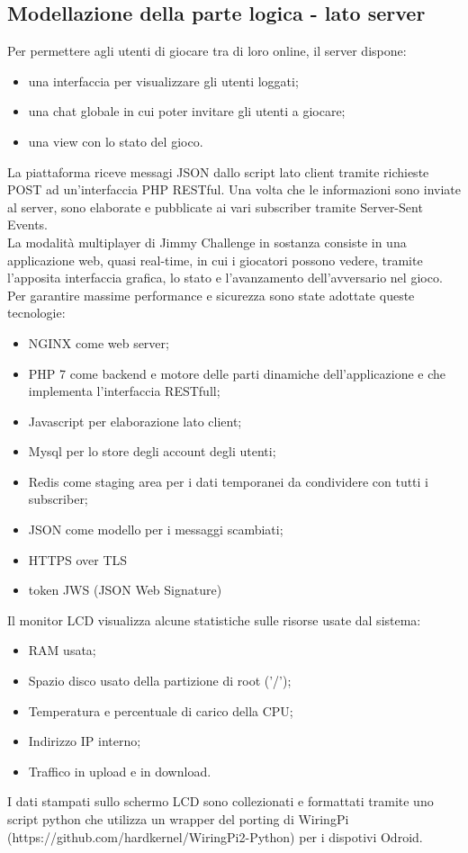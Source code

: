 \subsection{Modellazione della parte logica - lato server}
Per permettere agli utenti di giocare tra di loro online, il server dispone:
\begin{itemize}
	\item una interfaccia per visualizzare gli utenti loggati;
	\item una chat globale in cui poter invitare gli utenti a giocare;
	\item una view con lo stato del gioco.
\end{itemize}
La piattaforma riceve messagi JSON dallo script lato client tramite richieste POST ad un'interfaccia PHP RESTful. Una volta che le informazioni sono inviate al server, sono elaborate e pubblicate ai vari subscriber tramite Server-Sent Events.\\
La modalità multiplayer di Jimmy Challenge in sostanza consiste in una applicazione web, quasi real-time, in cui i giocatori possono vedere, tramite l'apposita interfaccia grafica, lo stato e l'avanzamento dell'avversario nel gioco.\\
Per garantire massime performance e sicurezza sono state adottate queste tecnologie:
\begin{itemize}
	\item NGINX come web server;
	\item PHP 7 come backend e motore delle parti dinamiche dell'applicazione e che implementa l'interfaccia RESTfull;
	\item Javascript per elaborazione lato client;
	\item Mysql per lo store degli account degli utenti;
	\item Redis come staging area per i dati temporanei da condividere con tutti i subscriber;
	\item JSON come modello per i messaggi scambiati;
	\item HTTPS over TLS
	\item token JWS (JSON Web Signature)
\end{itemize}
Il monitor LCD visualizza alcune statistiche sulle risorse usate dal sistema:
\begin{itemize}
	\item RAM usata;
	\item Spazio disco usato della partizione di root ('/');
	\item Temperatura e percentuale di carico della CPU;
	\item Indirizzo IP interno;
	\item Traffico in upload e in download.
\end{itemize}
I dati stampati sullo schermo LCD sono collezionati e formattati tramite uno script python che utilizza un wrapper del porting di WiringPi (https://github.com/hardkernel/WiringPi2-Python) per i dispotivi Odroid.

